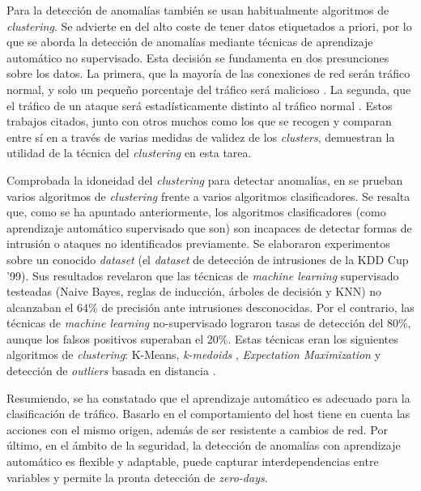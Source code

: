 Para la detección de anomalías también se usan habitualmente algoritmos de \emph{clustering}.
Se advierte en \cite{Leung_2005} del alto coste de tener datos etiquetados a priori,
por lo que se aborda la detección de anomalías mediante técnicas de aprendizaje automático no supervisado.
Esta decisión se fundamenta en dos presunciones sobre los datos.
La primera, que la mayoría de las conexiones de red serán tráfico normal, y solo un pequeño porcentaje del tráfico será malicioso \cite{Portnoy_2000}.
La segunda, que el tráfico de un ataque será estadísticamente distinto al tráfico normal \cite{Javitz_1993}.
Estos trabajos citados, junto con otros muchos como los que se recogen y comparan entre sí en \cite{Bhuyan_2014} a través de varias medidas de validez de los \emph{clusters},
demuestran la utilidad de la técnica del \emph{clustering} en esta tarea.

Comprobada la idoneidad del \emph{clustering} para detectar anomalías, en \cite{Syarif_2012} se prueban varios algoritmos de \emph{clustering} frente a varios algoritmos clasificadores.
Se resalta que, como se ha apuntado anteriormente, los algoritmos clasificadores (como aprendizaje automático supervisado que son) son incapaces de detectar formas de intrusión o ataques no identificados previamente.
Se elaboraron experimentos sobre un conocido \emph{dataset} (el \emph{dataset} de detección de intrusiones de la KDD Cup '99).
Sus resultados revelaron que las técnicas de \emph{machine learning} supervisado testeadas (Naive Bayes, reglas de inducción, árboles de decisión y KNN) no alcanzaban el 64\% de precisión ante intrusiones desconocidas.
Por el contrario, las técnicas de \emph{machine learning} no-supervisado lograron tasas de detección del 80\%, aunque los falsos positivos superaban el 20\%.
Estas técnicas eran los siguientes algoritmos de \emph{clustering}: K-Means, \emph{k-medoids} \cite{Velmurugan_2010}, \emph{Expectation Maximization} \cite{Lu_2009} y detección de \emph{outliers} basada en distancia \cite{Orair_2010}.

Resumiendo, se ha constatado que el aprendizaje automático es adecuado para la clasificación de tráfico.
Basarlo en el comportamiento del host tiene en cuenta las acciones con el mismo origen, además de ser resistente a cambios de red.
Por último, en el ámbito de la seguridad, la detección de anomalías con aprendizaje automático es flexible y adaptable, puede capturar interdependencias entre variables y permite la pronta detección de \emph{zero-days}.
